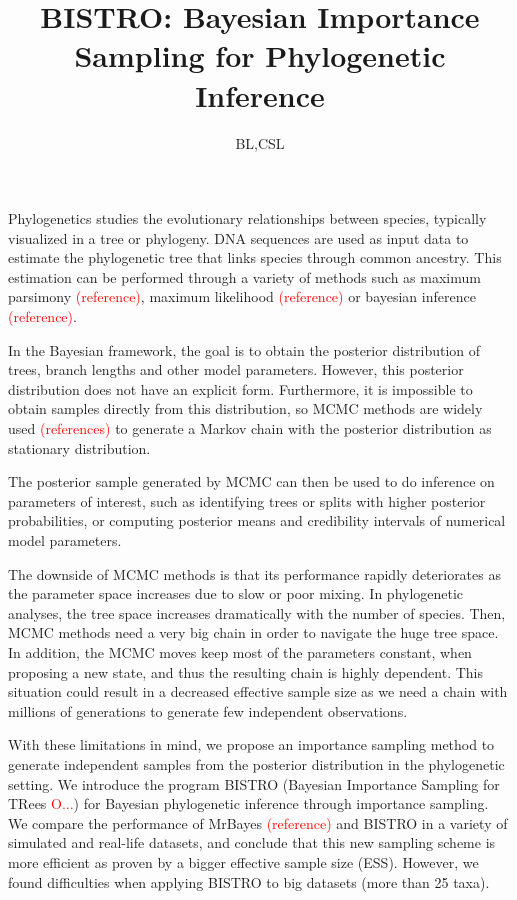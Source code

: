 \documentclass[conference]{IEEEtran}
\newcommand{\falta}[1]{\textcolor{red}{#1}}
\begin{document}
\title{BISTRO: Bayesian Importance Sampling for Phylogenetic Inference}
\author{BL,CSL}
\maketitle

Phylogenetics studies the evolutionary relationships between species,
typically visualized in a tree or phylogeny. DNA sequences are used as
input data to estimate the phylogenetic tree that links species
through common ancestry. This estimation can be performed through a
variety of methods such as maximum parsimony \falta{(reference)},
maximum likelihood \falta{(reference)} or bayesian inference
\falta{(reference)}.

In the Bayesian framework, the goal is to obtain the posterior
distribution of trees, branch lengths and other model
parameters. However, this posterior distribution does not have an
explicit form. Furthermore, it is impossible to obtain samples
directly from this distribution, so MCMC methods are widely used
\falta{(references)} to generate a Markov chain with the posterior
distribution as stationary distribution.

The posterior sample generated by MCMC can then be used to do
inference on parameters of interest, such as identifying trees or
splits with higher posterior probabilities, or computing posterior
means and credibility intervals of numerical model parameters.

The downside of MCMC methods is that its performance rapidly
deteriorates as the parameter space increases due to slow or poor
mixing. In phylogenetic analyses, the tree space increases
dramatically with the number of species. Then, MCMC methods need a
very big chain in order to navigate the huge tree space. In addition,
the MCMC moves keep most of the parameters constant, when proposing a
new state, and thus the resulting chain is highly dependent. This
situation could result in a decreased effective sample size as we need
a chain with millions of generations to generate few independent
observations.

With these limitations in mind, we propose an importance sampling
method to generate independent samples from the posterior distribution
in the phylogenetic setting. We introduce the program BISTRO (Bayesian
Importance Sampling for TRees \falta{O...}) for Bayesian phylogenetic
inference through importance sampling. We compare the performance of
MrBayes \falta{(reference)} and BISTRO in a variety of simulated and
real-life datasets, and conclude that this new sampling scheme is more
efficient as proven by a bigger effective sample size (ESS). However,
we found difficulties when applying BISTRO to big datasets (more than
25 taxa).
\end{document}
